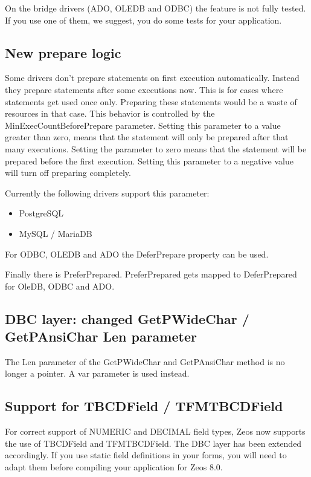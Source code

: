 \documentclass[a4paper,12pt,oneside]{report}
\begin{document}
On the bridge drivers (ADO, OLEDB and ODBC) the feature is not fully tested.
If you use one of them, we suggest, you do some tests for your application.

\subsection{New prepare logic}
\label{subsec:NewPrepareLogic}
Some drivers don't prepare statements on first execution automatically.
Instead they prepare statements after some executions now.
This is for cases where statements get used once only.
Preparing these statements would be a waste of resources in that case.
This behavior is controlled by the MinExecCountBeforePrepare parameter.
Setting this parameter to a value greater than zero, means that the statement will only be prepared after that many executions.
Setting the parameter to zero means that the statement will be prepared before the first execution.
Setting this parameter to a negative value will turn off preparing completely.

Currently the following drivers support this parameter:
\begin{itemize}
  	\item PostgreSQL
	\item MySQL / MariaDB
\end{itemize}

For ODBC, OLEDB and ADO the DeferPrepare property can be used.

Finally there is PreferPrepared.
PreferPrepared gets mapped to DeferPrepared for OleDB, ODBC and ADO.

\subsection{DBC layer: changed GetPWideChar / GetPAnsiChar Len parameter}
The Len parameter of the GetPWideChar and GetPAnsiChar method is no longer a pointer.
A var parameter is used instead.

\subsection{Support for TBCDField / TFMTBCDField}
For correct support of NUMERIC and DECIMAL field types, Zeos now supports the use of TBCDField and TFMTBCDField.
The DBC layer has been extended accordingly.
If you use static field definitions in your forms, you will need to adapt them before compiling your application for Zeos 8.0.
\end{document}
